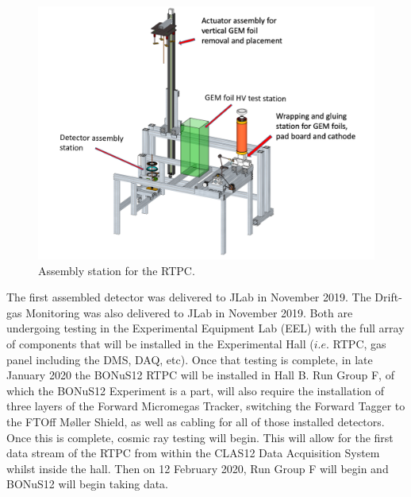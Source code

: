 \begin{figure}[h!]
	\centering
	\includegraphics[width=0.8\linewidth]{figures/rtpc_assembly.png}
	\caption{Assembly station for the RTPC.}
	\label{fig:rtpc_assembly}
\end{figure}

The first assembled detector was delivered to JLab in November 2019. The Drift-gas Monitoring was also delivered to JLab in November 2019. Both are undergoing testing in the Experimental Equipment Lab (EEL) with the full array of components that will be installed in the Experimental Hall ($i.e.$ RTPC, gas panel including the DMS, DAQ, etc). Once that testing is complete, in late January 2020 the BONuS12 RTPC will be installed in Hall B. Run Group F, of which the BONuS12 Experiment is a part, will also require the installation of three layers of the Forward Micromegas Tracker, switching the Forward Tagger to the FTOff M\o ller Shield, as well as cabling for all of those installed detectors. Once this is complete, cosmic ray testing will begin. This will allow for the first data stream of the RTPC from within the CLAS12 Data Acquisition System whilst inside the hall. Then on 12 February 2020, Run Group F will begin and BONuS12 will begin taking data. 